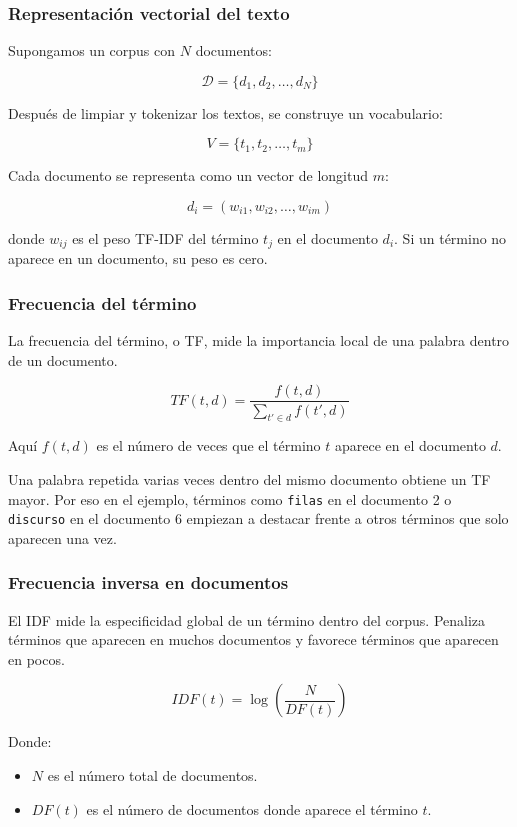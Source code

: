 \documentclass[
  spanish,
  letterpaper,
  DIV=11,
  numbers=noendperiod]{scrartcl}
\providecommand{\tightlist}{%
  \setlength{\itemsep}{0pt}\setlength{\parskip}{0pt}}
\begin{document}
\subsubsection{Representación vectorial del
texto}\label{representaciuxf3n-vectorial-del-texto}

Supongamos un corpus con \(N\) documentos:

\[\mathcal{D} = \{d_1, d_2, \ldots, d_N\}\]

Después de limpiar y tokenizar los textos, se construye un vocabulario:

\[V = \{t_1, t_2, \ldots, t_m\}\]

Cada documento se representa como un vector de longitud \(m\):

\[d_i = (w_{i1}, w_{i2}, \ldots, w_{im})\]

donde \(w_{ij}\) es el peso TF-IDF del término \(t_j\) en el documento
\(d_i\). Si un término no aparece en un documento, su peso es cero.

\subsubsection{Frecuencia del término}\label{frecuencia-del-tuxe9rmino}

La frecuencia del término, o TF, mide la importancia local de una
palabra dentro de un documento.

\[TF(t,d) = \frac{f(t,d)}{\sum_{t' \in d} f(t',d)}\]

Aquí \(f(t,d)\) es el número de veces que el término \(t\) aparece en el
documento \(d\).

Una palabra repetida varias veces dentro del mismo documento obtiene un
TF mayor. Por eso en el ejemplo, términos como \texttt{filas} en el
documento 2 o \texttt{discurso} en el documento 6 empiezan a destacar
frente a otros términos que solo aparecen una vez.

\subsubsection{Frecuencia inversa en
documentos}\label{frecuencia-inversa-en-documentos}

El IDF mide la especificidad global de un término dentro del corpus.
Penaliza términos que aparecen en muchos documentos y favorece términos
que aparecen en pocos.

\[IDF(t) = \log\left(\frac{N}{DF(t)}\right)\]

Donde:

\begin{itemize}
\tightlist
\item
  \(N\) es el número total de documentos.
\item
  \(DF(t)\) es el número de documentos donde aparece el término \(t\).
\end{itemize}
\end{document}
